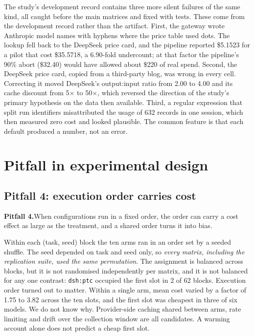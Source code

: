 \documentclass[10pt]{article}
\newenvironment{pitfall}[1]{\par\medskip\noindent\begin{lrbox}{\pitbox}\begin{minipage}{\dimexpr\linewidth-2\fboxsep-2\fboxrule\relax}\small\textbf{#1}\enskip}{\end{minipage}\end{lrbox}\fbox{\usebox{\pitbox}}\par\medskip}
\begin{document}
The study's development record contains three more silent failures of the same kind, all caught
before the main matrices and fixed with tests. These come from the development record rather than
the artifact. First, the gateway wrote Anthropic model names with hyphens where the price table used
dots. The lookup fell back to the DeepSeek price card, and the pipeline reported \$5.1523 for a pilot
that cost \$35.5718, a 6.90-fold undercount; at that factor the pipeline's 90\% abort (\$32.40) would
have allowed about \$220 of real spend.
Second, the DeepSeek price card, copied from a third-party blog, was wrong in every cell. Correcting
it moved DeepSeek's output:input ratio from 2.00 to 4.00 and its cache discount from 5$\times$ to
50$\times$, which reversed the direction of the study's primary hypothesis on the data then available.
Third, a regular expression that split run identifiers misattributed the usage of 632 records in one
session, which then measured zero cost and looked plausible. The common feature is that each default
produced a number, not an error.

\section{Pitfall in experimental design}\label{sec:design}

\subsection{Pitfall 4: execution order carries cost}\label{sec:p4}

\begin{pitfall}{Pitfall 4.}When configurations run in a fixed order, the order can carry a cost effect
as large as the treatment, and a shared order turns it into bias.\end{pitfall}

Within each (task, seed) block the ten arms ran in an order set by a seeded shuffle. The seed depended
on task and seed only, so \emph{every matrix, including the replication suite, used the same
permutation}. The assignment is balanced across blocks, but it is not randomised independently per
matrix, and it is not balanced for any one contrast: \texttt{dsh:ptc} occupied the first slot in 2 of
62 blocks. Execution order turned out to matter. Within a single arm, mean cost varied by a factor of
1.75 to 3.82 across the ten slots, and the first slot was cheapest in three of six models. We do
not know why. Provider-side caching shared between arms, rate limiting and drift over the collection
window are all candidates. A warming account alone does not predict a cheap first slot.
\end{document}
